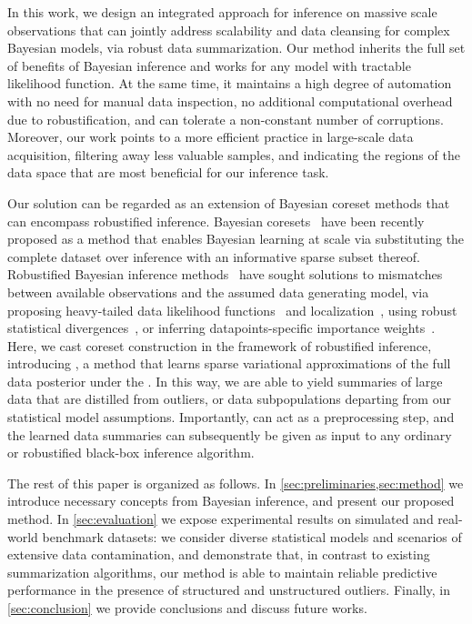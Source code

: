 In this work, we design an integrated approach for inference on massive scale observations that can jointly address scalability and data cleansing for complex Bayesian models, via robust data summarization. Our method inherits the full set of benefits of Bayesian inference and works for any model with tractable likelihood function. At the same time, it maintains a high degree of automation with no need for manual data inspection, no additional computational overhead due to robustification, and can tolerate a non-constant number of corruptions. Moreover, our work points to a more efficient practice in large-scale data acquisition, filtering away less valuable samples, and indicating the regions of the data space that are most beneficial for our inference task. 

Our solution can be regarded as an extension of Bayesian coreset methods that can encompass robustified inference. Bayesian coresets~\cite{huggins16, campbell19jmlr, campbell19neurips} have been recently proposed as a method that enables Bayesian learning at scale via substituting the complete dataset over inference with an informative sparse subset thereof. Robustified Bayesian inference methods~\cite{berger94} have sought solutions to mismatches between available observations and the assumed data generating model, %
via proposing heavy-tailed data likelihood functions~\cite{huber09, insua12} and localization~\cite{definetti61, wang18}, using robust statistical divergences~\cite{futami18, knoblauch18, miller19},  or inferring datapoints-specific importance weights~\cite{wang17}. Here, we cast coreset construction in the framework of robustified inference, introducing \emph{\bcores{}}, a method that learns sparse variational approximations of the full data posterior under the \bdiv{}. In this way, we are able to yield summaries of large data that are distilled from outliers, or data subpopulations departing from our statistical model assumptions. Importantly, \bcores{} can act as a preprocessing step, and the learned data summaries can subsequently be given as input to any ordinary or robustified black-box inference algorithm.

The rest of this paper is organized as follows. In \cref{sec:preliminaries,sec:method} we introduce necessary concepts from Bayesian inference, and present our proposed method. In \cref{sec:evaluation} we expose experimental results on simulated and real-world benchmark datasets: we consider diverse statistical models and scenarios of extensive data contamination, and demonstrate that, in contrast to existing summarization algorithms, our method is able to maintain reliable predictive performance in the presence of structured and unstructured outliers. Finally, in \cref{sec:conclusion} we provide conclusions and discuss future works.




